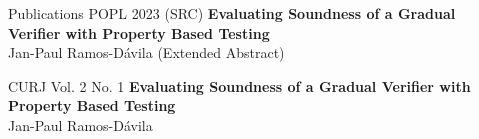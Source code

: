 
\begin{rSection}{Publications}
	POPL 2023 (SRC) \phantom{} \hspace{1.5mm} \textbf{Evaluating Soundness of a Gradual Verifier with Property Based Testing} \href{https://popl23.sigplan.org/details/POPL-2023-student-research-competition/13/Evaluating-Soundness-of-a-Gradual-Verifier-with-Property-Based-Testing}{\ExternalLink}
	\\ 
	\phantom{} \hspace{3.4cm} \small{Jan-Paul Ramos-D{\'a}vila (Extended Abstract)}\normalsize{} 

	CURJ Vol. 2 No. 1 \phantom{} \hspace{0.5mm} \textbf{Evaluating Soundness of a Gradual Verifier with Property Based Testing} \href{https://journals.library.cornell.edu/index.php/CURJ/}{\ExternalLink}
	\\ 
	\phantom{} \hspace{3.4cm} \small{Jan-Paul Ramos-D{\'a}vila}\normalsize{}

\end{rSection}
